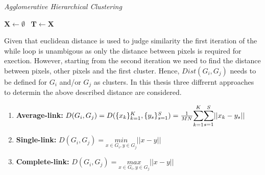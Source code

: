 \documentclass[aodsor,preprint]{imsart}
\numberwithin{equation}{section}
\theoremstyle{plain}
\begin{document}
{}
\begin{algorithm}[hbt!]
	\caption{\textit{Agglomerative Hierarchical Clustering}}\label{alg:one}
	$\mathbf{X} \gets \emptyset$\ 
	$\mathbf{T} \gets \mathbf{X}$
\end{algorithm}

Given that euclidean distance is used to judge similarity the first iteration of the while loop is unambigous as only the distance between pixels is required for exection. However, starting from the second iteration we need to find the distance between pixels, other pixels and the first cluster. Hence, $Dist(G_i, G_j)$ needs to be defined for $G_i$ and/or $G_j$ as clusters. In this thesis three diffrernt approaches to determin the above described distance are considered.

\begin{enumerate}
	\item \textbf{Average-link:} $D(G_i, G_j) = D(\{x_k\}_{k = 1}^K, \{y_s\}_{s = 1}^S) = \frac{1}{MN} \mathlarger{\sum}_{k = 1}^K \mathlarger{\sum}_{s = 1}^S \lvert\lvert x_k - y_s\rvert \rvert$
	
	\item \textbf{Single-link:} $D(G_i, G_j) = \underset{x \in G_i, y \in G_j}{min} \lvert \lvert x - y\rvert \rvert$
	
	\item \textbf{Complete-link:} $D(G_i, G_j) = \underset{x \in G_i, y \in G_j}{max} \lvert \lvert x - y\rvert \rvert$
\end{enumerate}
\end{document}

